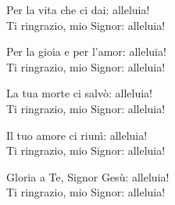 
\strofa Per la vita che ci dai: alleluia!\\
Ti ringrazio, mio Signor: alleluia!

\spazio

\strofa Per la gioia e per l'amor: alleluia!\\
Ti ringrazio, mio Signor: alleluia!

\spazio

\strofa La tua morte ci salvò: alleluia!\\
Ti ringrazio, mio Signor: alleluia!

\spazio

\strofa Il tuo amore ci riunì: alleluia!\\
Ti ringrazio, mio Signor: alleluia!

\spazio

\strofa Gloria a Te, Signor Gesù: alleluia!\\
Ti ringrazio, mio Signor: alleluia!